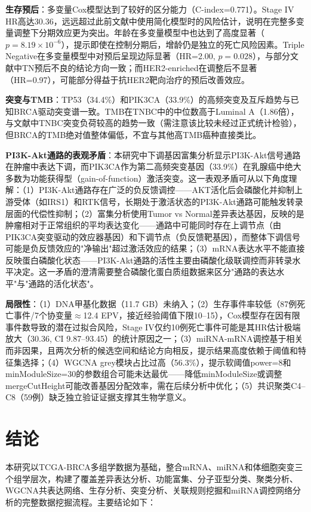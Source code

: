\documentclass[12pt,a4paper,openany]{ctexbook}
\begin{document}
\textbf{生存预后}：多变量Cox模型达到了较好的区分能力（C-index=0.771）。Stage IV HR高达30.36，远远超过此前文献中使用简化模型时的风险估计，说明在完整多变量调整下分期效应更为突出。年龄在多变量模型中也达到了高度显著（$p=8.19\times10^{-6}$），提示即使在控制分期后，增龄仍是独立的死亡风险因素。Triple Negative在多变量模型中对预后呈现边际显著（HR=2.00, $p=0.028$），与部分文献中TN预后不良的结论方向一致；而HER2-enriched在调整后不显著（HR=0.97），可能部分得益于抗HER2靶向治疗的预后改善效应。

\textbf{突变与TMB}：TP53（34.4\%）和PIK3CA（33.9\%）的高频突变及互斥趋势与已知BRCA驱动突变谱一致。TMB在TNBC中的中位数高于Luminal A（1.86倍），与文献中TNBC突变负荷较高的趋势一致（需注意该比较未经过正式统计检验），但BRCA的TMB绝对值整体偏低，不宜与其他高TMB癌种直接类比。

\noindent\textbf{PI3K-Akt通路的表观矛盾}：本研究中下调基因富集分析显示PI3K-Akt信号通路在肿瘤中表达下调，而PIK3CA作为第二高频突变基因（33.9\%）在乳腺癌中绝大多数为功能获得型（gain-of-function）激活突变。这一表观矛盾可从以下角度理解：（1）PI3K-Akt通路存在广泛的负反馈调控——AKT活化后会磷酸化并抑制上游受体（如IRS1）和RTK信号，长期处于激活状态的PI3K-Akt通路可能触发转录层面的代偿性抑制；（2）富集分析使用Tumor vs Normal差异表达基因，反映的是肿瘤相对于正常组织的平均表达变化——通路中可能同时存在上调节点（由PIK3CA突变驱动的效应器基因）和下调节点（负反馈靶基因），而整体下调信号可能是负反馈效应的"净输出"超过激活效应的结果；（3）mRNA表达水平不能直接反映蛋白磷酸化状态——PI3K-Akt通路的活性主要由磷酸化级联调控而非转录水平决定。这一矛盾的澄清需要整合磷酸化蛋白质组数据来区分"通路的表达水平"与"通路的活化状态"。

\textbf{局限性}：（1）DNA甲基化数据（11.7 GB）未纳入；（2）生存事件率较低（87例死亡事件/7个协变量$\approx$12.4 EPV，接近经验阈值下限10--15），Cox模型存在因有限事件数导致的潜在过拟合风险，Stage IV仅约10例死亡事件可能是其HR估计极端放大（30.36, CI 9.87--93.45）的统计原因之一；（3）miRNA-mRNA调控基于相关而非因果，且两次分析的候选空间和结论方向相反，提示结果高度依赖于阈值和特征集选择；（4）WGCNA grey模块占比过高（56.3\%），提示软阈值power=8和minModuleSize=30的参数组合可能未达最优——降低minModuleSize或调整mergeCutHeight可能改善基因分配效率，需在后续分析中优化；（5）共识聚类C4--C8（59例）缺乏独立验证证据支撑其生物学意义。

\chapter{结论}
本研究以TCGA-BRCA多组学数据为基础，整合mRNA、miRNA和体细胞突变三个组学层次，构建了覆盖差异表达分析、功能富集、分子亚型分类、聚类分析、WGCNA共表达网络、生存分析、突变分析、关联规则挖掘和miRNA调控网络分析的完整数据挖掘流程。主要结论如下：
\end{document}
